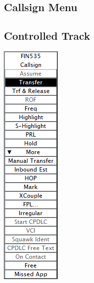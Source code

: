 \documentclass[11pt,a4paper]{memoir}
\begin{document}
\subsection{Callsign Menu}
\label{menu:cs}

\subsection*{Controlled Track}

\includegraphics{img/cm.png}
\end{document}
